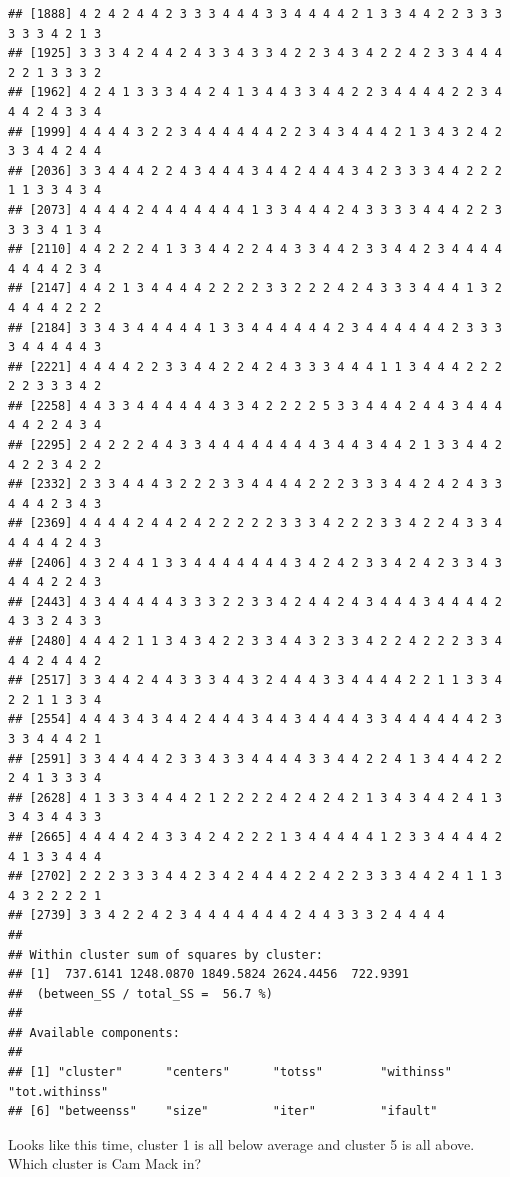 \documentclass[]{book}
\newenvironment{Shaded}{\begin{snugshade}}{\end{snugshade}}
\newcommand{\KeywordTok}[1]{\textcolor[rgb]{0.13,0.29,0.53}{\textbf{#1}}}
\newcommand{\NormalTok}[1]{#1}
\newcommand{\OperatorTok}[1]{\textcolor[rgb]{0.81,0.36,0.00}{\textbf{#1}}}
\newcommand{\StringTok}[1]{\textcolor[rgb]{0.31,0.60,0.02}{#1}}
\begin{document}
\begin{verbatim}
## [1888] 4 2 4 2 4 4 2 3 3 3 4 4 4 3 3 4 4 4 4 2 1 3 3 4 4 2 2 3 3 3 3 3 3 4 2 1 3
## [1925] 3 3 3 4 2 4 4 2 4 3 3 4 3 3 4 2 2 3 4 3 4 2 2 4 2 3 3 4 4 4 2 2 1 3 3 3 2
## [1962] 4 2 4 1 3 3 3 4 4 2 4 1 3 4 4 3 3 4 4 2 2 3 4 4 4 4 2 2 3 4 4 4 2 4 3 3 4
## [1999] 4 4 4 4 3 2 2 3 4 4 4 4 4 4 2 2 3 4 3 4 4 4 2 1 3 4 3 2 4 2 3 3 4 4 2 4 4
## [2036] 3 3 4 4 4 2 2 4 3 4 4 4 3 4 4 2 4 4 4 3 4 2 3 3 3 4 4 2 2 2 1 1 3 3 4 3 4
## [2073] 4 4 4 4 2 4 4 4 4 4 4 4 1 3 3 4 4 4 2 4 3 3 3 3 4 4 4 2 2 3 3 3 3 4 1 3 4
## [2110] 4 4 2 2 2 4 1 3 3 4 4 2 2 4 4 3 3 4 4 2 3 3 4 4 2 3 4 4 4 4 4 4 4 4 2 3 4
## [2147] 4 4 2 1 3 4 4 4 4 2 2 2 2 3 3 2 2 2 4 2 4 3 3 3 4 4 4 1 3 2 4 4 4 4 2 2 2
## [2184] 3 3 4 3 4 4 4 4 4 1 3 3 4 4 4 4 4 4 2 3 4 4 4 4 4 4 2 3 3 3 3 4 4 4 4 4 3
## [2221] 4 4 4 4 2 2 3 3 4 4 2 2 4 2 4 3 3 3 4 4 4 1 1 3 4 4 4 2 2 2 2 2 3 3 3 4 2
## [2258] 4 4 3 3 4 4 4 4 4 4 3 3 4 2 2 2 2 5 3 3 4 4 4 2 4 4 3 4 4 4 4 4 2 2 4 3 4
## [2295] 2 4 2 2 2 4 4 3 3 4 4 4 4 4 4 4 4 3 4 4 3 4 4 2 1 3 3 4 4 2 4 2 2 3 4 2 2
## [2332] 2 3 3 4 4 4 3 2 2 2 3 3 4 4 4 4 2 2 2 3 3 3 4 4 2 4 2 4 3 3 4 4 4 2 3 4 3
## [2369] 4 4 4 4 2 4 4 2 4 2 2 2 2 2 3 3 3 4 2 2 2 3 3 4 2 2 4 3 3 4 4 4 4 4 2 4 3
## [2406] 4 3 2 4 4 1 3 3 4 4 4 4 4 4 4 3 4 2 4 2 3 3 4 2 4 2 3 3 4 3 4 4 4 2 2 4 3
## [2443] 4 3 4 4 4 4 4 3 3 3 2 2 3 3 4 2 4 4 2 4 3 4 4 4 3 4 4 4 4 2 4 3 3 2 4 3 3
## [2480] 4 4 4 2 1 1 3 4 3 4 2 2 3 3 4 4 3 2 3 3 4 2 2 4 2 2 2 3 3 4 4 4 2 4 4 4 2
## [2517] 3 3 4 4 2 4 4 3 3 3 4 4 3 2 4 4 4 3 3 4 4 4 4 2 2 1 1 3 3 4 2 2 1 1 3 3 4
## [2554] 4 4 4 3 4 3 4 4 2 4 4 4 3 4 4 3 4 4 4 4 3 3 4 4 4 4 4 4 2 3 3 3 4 4 4 2 1
## [2591] 3 3 4 4 4 4 2 3 3 4 3 3 4 4 4 4 3 3 4 4 2 2 4 1 3 4 4 4 2 2 2 4 1 3 3 3 4
## [2628] 4 1 3 3 3 4 4 4 2 1 2 2 2 2 4 2 4 2 4 2 1 3 4 3 4 4 2 4 1 3 3 4 3 4 4 3 3
## [2665] 4 4 4 4 2 4 3 3 4 2 4 2 2 2 1 3 4 4 4 4 4 1 2 3 3 4 4 4 4 2 4 1 3 3 4 4 4
## [2702] 2 2 2 3 3 3 4 4 2 3 4 2 4 4 4 2 2 4 2 2 3 3 3 4 4 2 4 1 1 3 4 3 2 2 2 2 1
## [2739] 3 3 4 2 2 4 2 3 4 4 4 4 4 4 4 2 4 4 3 3 3 2 4 4 4 4
## 
## Within cluster sum of squares by cluster:
## [1]  737.6141 1248.0870 1849.5824 2624.4456  722.9391
##  (between_SS / total_SS =  56.7 %)
## 
## Available components:
## 
## [1] "cluster"      "centers"      "totss"        "withinss"     "tot.withinss"
## [6] "betweenss"    "size"         "iter"         "ifault"
\end{verbatim}

Looks like this time, cluster 1 is all below average and cluster 5 is all above. Which cluster is Cam Mack in?

\begin{Shaded}
\end{Shaded}
\end{document}
